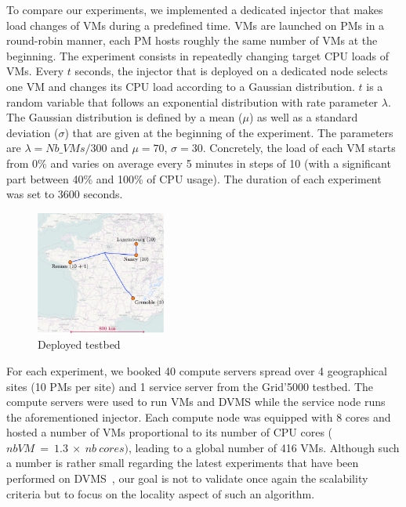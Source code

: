 To compare our experiments, we implemented a dedicated injector that makes load changes of
VMs during a predefined time. VMs are launched on PMs in a round-robin manner, \ie each
PM hosts roughly the same number of VMs at the beginning. The experiment consists in
repeatedly changing target CPU loads of VMs. Every $t$ seconds, the injector that is
deployed on a dedicated node selects one VM and changes its CPU load according to a
Gaussian distribution. $t$ is a random variable that follows an exponential distribution
with rate parameter $\lambda$. The Gaussian distribution is defined by a mean ($\mu$) as
well as a standard deviation ($\sigma$) that are given at the beginning of the experiment.
The parameters are $\lambda=\mathit{Nb\_VMs}/300$ and $\mu=70$, $\sigma=30$.
Concretely, the load of each VM starts from 0\% and varies on average every 5
minutes in steps of 10 (with a significant part between 40\% and 100\% of CPU
usage). The duration of each experiment was set to 3600 seconds.

\begin{figure}
 \begin{center}
\includegraphics[width=0.38\textwidth]{./Figures/testbed.png}
\caption{Deployed testbed}
\label{fig:testbed}
\end{center}
\end{figure}

For each experiment, we booked 40 compute servers spread over 4 geographical sites (10
PMs per site) and 1 service server from the Grid'5000 testbed. The compute servers
were used to run VMs and DVMS while the service node runs the aforementioned
injector.
%
Each compute node was equipped with 8 cores and hosted a number of VMs
proportional to its number of CPU cores ($nb VM\ =\ 1.3\ \times\ nb\ cores)$, leading to
a global number of 416 VMs. Although such a number is rather small regarding the latest
experiments that have been performed on DVMS~\cite{quesnel:ispa2013}, our goal is not to
validate once again the scalability criteria but to focus on the locality aspect of such
an algorithm.


